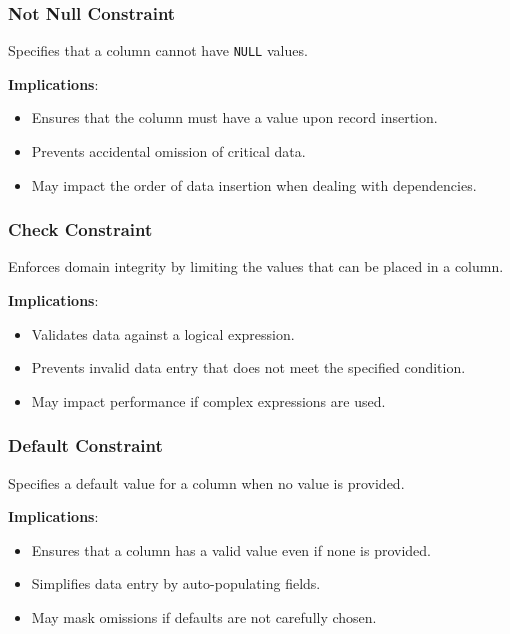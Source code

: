 \documentclass[12pt]{article}
\begin{document}
\subsubsection*{Not Null Constraint}

Specifies that a column cannot have \texttt{NULL} values.

\textbf{Implications}:

\begin{itemize}
    \item Ensures that the column must have a value upon record insertion.
    \item Prevents accidental omission of critical data.
    \item May impact the order of data insertion when dealing with dependencies.
\end{itemize}

\subsubsection*{Check Constraint}

Enforces domain integrity by limiting the values that can be placed in a column.

\textbf{Implications}:

\begin{itemize}
    \item Validates data against a logical expression.
    \item Prevents invalid data entry that does not meet the specified condition.
    \item May impact performance if complex expressions are used.
\end{itemize}

\subsubsection*{Default Constraint}

Specifies a default value for a column when no value is provided.

\textbf{Implications}:

\begin{itemize}
    \item Ensures that a column has a valid value even if none is provided.
    \item Simplifies data entry by auto-populating fields.
    \item May mask omissions if defaults are not carefully chosen.
\end{itemize}
\end{document}
